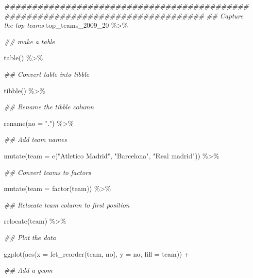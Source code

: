 \documentclass[]{tufte-handout}
\newenvironment{Shaded}{}{}
\newcommand{\AttributeTok}[1]{\textcolor[rgb]{0.49,0.56,0.16}{#1}}
\newcommand{\DocumentationTok}[1]{\textcolor[rgb]{0.73,0.13,0.13}{\textit{#1}}}
\newcommand{\FunctionTok}[1]{\textcolor[rgb]{0.02,0.16,0.49}{#1}}
\newcommand{\NormalTok}[1]{#1}
\newcommand{\SpecialCharTok}[1]{\textcolor[rgb]{0.25,0.44,0.63}{#1}}
\newcommand{\StringTok}[1]{\textcolor[rgb]{0.25,0.44,0.63}{#1}}
\begin{document}
\begin{Shaded}
\begin{Highlighting}[]
\DocumentationTok{\#\#\#\#\#\#\#\#\#\#\#\#\#\#\#\#\#\#\#\#\#\#\#\#\#\#\#\#\#\#\#\#\#\#\#\#\#\#\#\#\#\#\#\#\#\#\#\#\#\#\#\#\#\#\#\#\#\#\#\#\#\#\#\#\#\#\#\#\#\#\#\#\#\#\#\#\#\#\#\#}
\DocumentationTok{\#\# Capture the top teams}
\NormalTok{top\_teams\_2009\_20 }\SpecialCharTok{\%\textgreater{}\%} 
        
        \DocumentationTok{\#\# make a table}
        
        \FunctionTok{table}\NormalTok{() }\SpecialCharTok{\%\textgreater{}\%} 
        
        \DocumentationTok{\#\# Convert table into tibble}
        
        \FunctionTok{tibble}\NormalTok{() }\SpecialCharTok{\%\textgreater{}\%} 
        
        \DocumentationTok{\#\# Rename the tibble column}
        
        \FunctionTok{rename}\NormalTok{(}\AttributeTok{no =} \StringTok{"."}\NormalTok{) }\SpecialCharTok{\%\textgreater{}\%} 
        
        \DocumentationTok{\#\# Add team names}
        
        \FunctionTok{mutate}\NormalTok{(}\AttributeTok{team =} \FunctionTok{c}\NormalTok{(}\StringTok{"Atletico Madrid"}\NormalTok{, }\StringTok{"Barcelona"}\NormalTok{, }\StringTok{"Real madrid"}\NormalTok{)) }\SpecialCharTok{\%\textgreater{}\%} 
        
        \DocumentationTok{\#\# Convert teams to factors}
        
        \FunctionTok{mutate}\NormalTok{(}\AttributeTok{team =} \FunctionTok{factor}\NormalTok{(team)) }\SpecialCharTok{\%\textgreater{}\%} 
        
        \DocumentationTok{\#\# Relocate team column to first position}
        
        \FunctionTok{relocate}\NormalTok{(team) }\SpecialCharTok{\%\textgreater{}\%} 
        
        \DocumentationTok{\#\# Plot the data}
        
        \FunctionTok{ggplot}\NormalTok{(}\FunctionTok{aes}\NormalTok{(}\AttributeTok{x =} \FunctionTok{fct\_reorder}\NormalTok{(team, no), }\AttributeTok{y =}\NormalTok{ no, }\AttributeTok{fill =}\NormalTok{ team)) }\SpecialCharTok{+} 
        
        \DocumentationTok{\#\# Add a geom}
        

\end{Highlighting}
\end{Shaded}
\end{document}
